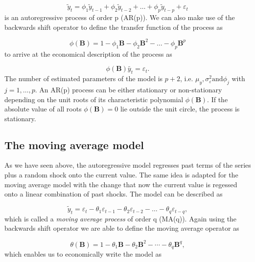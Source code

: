 \begin{equation}
        \tilde{y}_{t}=\phi_{1} \tilde{y}_{t-1}+\phi_{2} \tilde{y}_{t-2}+\dots+\phi_{p} \tilde{y}_{t-p}+\varepsilon_{t}
\end{equation}
%
is an autoregressive process of order p (AR(p)). We can also make use of the backwards shift operator to define the transfer function of the process as 

\begin{equation}
        \phi(\boldsymbol{B})=1-\phi_{1} \boldsymbol{B}-\phi_{2} \boldsymbol{B}^{2}-\dots-\phi_{p} \boldsymbol{B}^{p}
\end{equation}
%
to arrive at the economical description of the process as

\begin{equation}
        \phi(\boldsymbol{B})\tilde{y_t} = \varepsilon_t.
\end{equation}
%
The number of estimated parameters of the model is $p + 2$, i.e. $\mu_y, \sigma^2_\varepsilon \mathrm{and } \phi_j$ with $j = 1,\dots, p$. An AR(p) process can be either stationary or non-stationary depending on the unit roots of its characteristic polynomial $\phi(\boldsymbol{B})$. If the absolute value of all roots $\phi(\boldsymbol{B}) = 0$ lie outside the unit circle, the process is stationary. 

\subsection{The moving average model}

As we have seen above, the autoregressive model regresses past terms of the series plus a random shock onto the current value. The same idea is adapted for the moving average model with the change that now the current value is regessed onto a linear combination of past shocks. The model can be described as 

\begin{equation}
        \tilde{y}_{t}=\varepsilon_{t}-\theta_{1} \varepsilon_{t-1}-\theta_{2} \varepsilon_{t-2}-\dots-\theta_{q} \varepsilon_{t-q},
\end{equation}
%
which is called a \textit{moving average process} of order q (MA(q)). Again using the backwards shift operator we are able to define the moving average operator as

\begin{equation*}
        \theta(\boldsymbol{B})=1-\theta_{1} \boldsymbol{B}-\theta_{2} \boldsymbol{B}^{2}-\cdots-\theta_{q} \boldsymbol{B}^{q},
\end{equation*}
%
which enables us to economically write the model as

